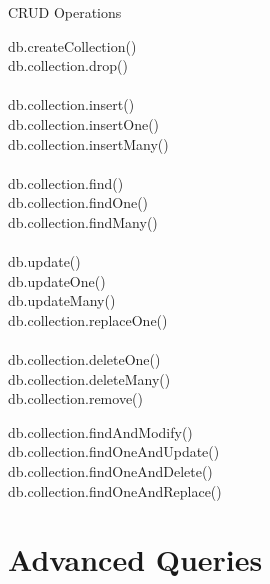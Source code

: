 \documentclass{beamer}
\begin{document}
\begin{frame}{CRUD Operations}
	\begin{minipage}[t]{0.48\textwidth}
		\scriptsize
		\begin{Alms*}
			db.createCollection() \\
			db.collection.drop() \\
			\\
			db.collection.insert() \\
			db.collection.insertOne() \\
			db.collection.insertMany() \\
			\\
			db.collection.find() \\
			db.collection.findOne() \\
			db.collection.findMany() \\
			\\
			db.update()  \\
			db.updateOne() \\
			db.updateMany() \\
			db.collection.replaceOne() \\
			\\
			db.collection.deleteOne() \\
			db.collection.deleteMany() \\
			db.collection.remove()
			
		\end{Alms*}
	\end{minipage}
	\hfill
	\begin{minipage}[t]{0.48\textwidth}
		\scriptsize
		\begin{Alms*}
			db.collection.findAndModify() \\
			db.collection.findOneAndUpdate() \\
			db.collection.findOneAndDelete() \\
			db.collection.findOneAndReplace() \\
			
		\end{Alms*}
	\end{minipage}
\end{frame}

\section{Advanced Queries}
\begin{frame}
    
\end{frame}
\end{document}
